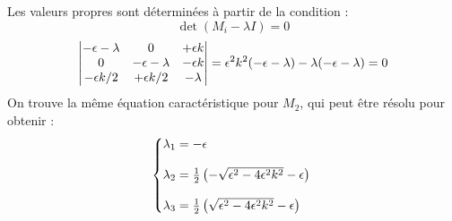 %
Les valeurs propres sont déterminées à partir de la condition :
%
\begin{dmath}
    \det(M_i - \lambda I)=0
\end{dmath}
%
\begin{dmath}
    \begin{vmatrix}
        -\epsilon - \lambda & 0 & +\epsilon k \\
        0 & -\epsilon - \lambda & -\epsilon k \\
        -\epsilon k/2 & +\epsilon k/2 & - \lambda
    \end{vmatrix}
    = \epsilon^2 k^2(-\epsilon - \lambda) - \lambda(-\epsilon - \lambda) \\
    = 0
\end{dmath}
%
On trouve la même équation caractéristique pour $M_2$, qui peut être résolu pour obtenir :
%
\begin{equation}
  \left\{\begin{array}{@{}l@{}}
    \lambda_1 = -\epsilon \\
    \\
    \lambda_2 = \frac{1}{2}\left(  -\sqrt{\epsilon^2 - 4\epsilon^2k^2} - \epsilon \right) \\
    \\
    \lambda_3 = \frac{1}{2}\left( \sqrt{\epsilon^2 - 4\epsilon^2k^2} - \epsilon \right)
  \end{array}\right.\,
\end{equation}
